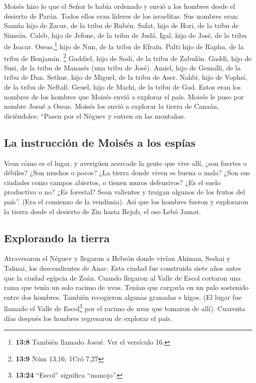  Moisés hizo lo que el Señor le había ordenado y envió a
los hombres desde el desierto de Parán. Todos ellos eran líderes de los
israelitas.  Sus nombres eran: Samúa hijo de Zacur, de la
tribu de Rubén.  Safat, hijo de Hori, de la tribu de
Simeón.  Caleb, hijo de Jefone, de la tribu de Judá.
 Igal, hijo de José, de la tribu de Isacar. 
Oseas,\footnote{\textbf{13:8} También llamado Josué. Ver el versículo
  16.} hijo de Nun, de la tribu de Efraín.  Palti hijo de
Raphu, de la tribu de Benjamín. \footnote{\textbf{13:9} Núm 13,16; 1Cró
  7,27}  Gaddiel, hijo de Sodi, de la tribu de Zabulón.
 Gaddi, hijo de Susi, de la tribu de Manasés (una tribu
de José).  Amiel, hijo de Gemalli, de la tribu de Dan.
 Sethur, hijo de Miguel, de la tribu de Aser.
 Nahbi, hijo de Vophsi, de la tribu de Neftalí.
 Geuel, hijo de Machi, de la tribu de Gad.
 Estos eran los nombres de los hombres que Moisés envió a
explorar el país. Moisés le puso por nombre Josué a Oseas.
 Moisés los envió a explorar la tierra de Canaán,
diciéndoles: ``Pasen por el Néguev y entren en las montañas.

\hypertarget{la-instrucciuxf3n-de-moisuxe9s-a-los-espuxedas}{%
\subsection{La instrucción de Moisés a los
espías}\label{la-instrucciuxf3n-de-moisuxe9s-a-los-espuxedas}}

 Vean cómo es el lugar, y averigüen acercade la gente que
vive allí, ¿son fuertes o débiles? ¿Son muchos o pocos? 
¿La tierra donde viven es buena o mala? ¿Son sus ciudades como campos
abiertos, o tienen muros defensivos?  ¿Es el suelo
productivo o no? ¿Es forestal? Sean valientes y traigan algunos de los
frutos del país''. (Era el comienzo de la vendimia).  Así
que los hombres fueron y exploraron la tierra desde el desierto de Zin
hasta Rejob, el oso Lebó Jamat.

\hypertarget{explorando-la-tierra}{%
\subsection{Explorando la tierra}\label{explorando-la-tierra}}

 Atravesaron el Néguev y llegaron a Hebrón donde vivían
Ahiman, Seshai y Talmai, los descendientes de Anac. Esta ciudad fue
construida siete años antes que la ciudad egipcia de Zoán.
 Cuando llegaron al Valle de Escol cortaron una rama que
tenía un solo racimo de uvas. Tenían que cargarla en un palo sostenido
entre dos hombres. También recogieron algunas granadas e higos.
 (El lugar fue llamado el Valle de Escol\footnote{\textbf{13:24}
  ``Escol'' significa ``manojo''.} por el racimo de uvas que tomaron de
allí).  Cuarenta días después los hombres regresaron de
explorar el país.


